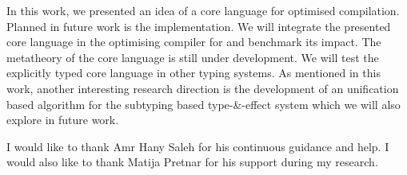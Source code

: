 \documentclass[sigplan,10pt]{acmart}\settopmatter{printfolios=true}
\begin{document}
\noindent In this work, we presented an idea of a core language for optimised compilation. Planned in future work is the implementation. We will integrate the presented core language in the optimising compiler for \eff and benchmark its impact. The metatheory of the core language is still under development. We will test the explicitly typed core language in other typing systems. As mentioned in this work, another interesting research direction is the development of an unification based algorithm for the subtyping based type-\&-effect system which we will also explore in future work.

\begin{acks}
  I would like to thank Amr Hany Saleh for his continuous guidance and help. I would also like to thank Matija Pretnar for his support during my research.
\end{acks}


\end{document}
